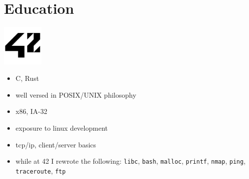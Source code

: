 \section{Education}

\noindent
\begin{minipage}{.15\textwidth}
\centerline{\includegraphics[width=20mm]{img/42}}
\end{minipage}%
\hspace{5mm}
\begin{minipage}{.9\textwidth}
\raggedright
\begin{minipage}[t]{.50\textwidth}
    \begin{itemize}
        \item C, Rust
        \item well versed in POSIX/UNIX philosophy
        \item x86, IA-32
        \item exposure to linux development
        \item tcp/ip, client/server basics
    \end{itemize}
\end{minipage}
\begin{minipage}[t]{.30\textwidth}
    \begin{itemize}
		\item while at 42 I rewrote the following: \texttt{libc}, \texttt{bash}, \texttt{malloc}, \texttt{printf}, \texttt{nmap}, \texttt{ping}, \texttt{traceroute}, \texttt{ftp}
    \end{itemize}
\end{minipage}
\end{minipage}

